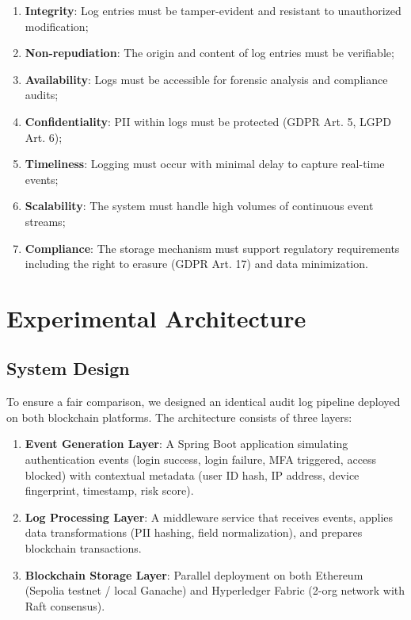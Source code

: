 \documentclass[12pt,a4paper]{article}
\begin{document}
\begin{enumerate}
    \item \textbf{Integrity}: Log entries must be tamper-evident and resistant to unauthorized modification;
    \item \textbf{Non-repudiation}: The origin and content of log entries must be verifiable;
    \item \textbf{Availability}: Logs must be accessible for forensic analysis and compliance audits;
    \item \textbf{Confidentiality}: PII within logs must be protected (GDPR Art. 5, LGPD Art. 6);
    \item \textbf{Timeliness}: Logging must occur with minimal delay to capture real-time events;
    \item \textbf{Scalability}: The system must handle high volumes of continuous event streams;
    \item \textbf{Compliance}: The storage mechanism must support regulatory requirements including the right to erasure (GDPR Art. 17) and data minimization.
\end{enumerate}

\section{Experimental Architecture}
\label{sec:architecture}

\subsection{System Design}

To ensure a fair comparison, we designed an identical audit log pipeline deployed on both blockchain platforms. The architecture consists of three layers:

\begin{enumerate}
    \item \textbf{Event Generation Layer}: A Spring Boot application simulating authentication events (login success, login failure, MFA triggered, access blocked) with contextual metadata (user ID hash, IP address, device fingerprint, timestamp, risk score).
    \item \textbf{Log Processing Layer}: A middleware service that receives events, applies data transformations (PII hashing, field normalization), and prepares blockchain transactions.
    \item \textbf{Blockchain Storage Layer}: Parallel deployment on both Ethereum (Sepolia testnet / local Ganache) and Hyperledger Fabric (2-org network with Raft consensus).
\end{enumerate}
\end{document}
